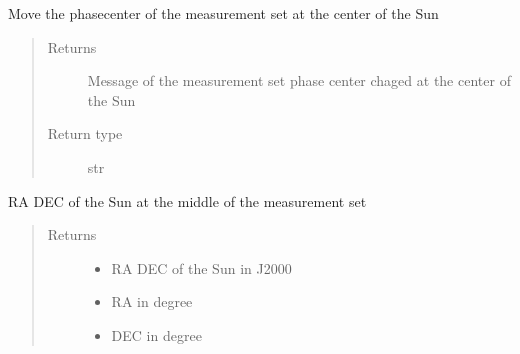 \documentclass[letterpaper,10pt,english]{sphinxmanual}
\begin{document}
\begin{fulllineitems}
\begin{fulllineitems}
\end{fulllineitems}


\begin{fulllineitems}
\label{\detokenize{paircars:paircars.access_ms.AccessMS.move_phasecenter_to_sun}}
\sphinxAtStartPar
Move the phasecenter of the measurement set at the center of the Sun
\begin{quote}\begin{description}
\item[{Returns}] \leavevmode
\sphinxAtStartPar
Message of the measurement set phase center chaged at the center of the Sun

\item[{Return type}] \leavevmode
\sphinxAtStartPar
str

\end{description}\end{quote}

\end{fulllineitems}


\begin{fulllineitems}
\label{\detokenize{paircars:paircars.access_ms.AccessMS.radec_sun}}
\sphinxAtStartPar
RA DEC of the Sun at the middle of the measurement set
\begin{quote}\begin{description}
\item[{Returns}] \leavevmode
\sphinxAtStartPar
\begin{itemize}
\item {} 
\sphinxAtStartPar
{} \textendash{} RA DEC of the Sun in J2000

\item {} 
\sphinxAtStartPar
{} \textendash{} RA in degree

\item {} 
\sphinxAtStartPar
{} \textendash{} DEC in degree

\end{itemize}


\end{description}\end{quote}

\end{fulllineitems}


\end{fulllineitems}
\end{document}
